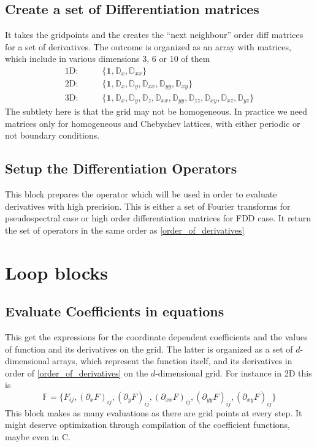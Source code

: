 \documentclass[a4paper,12pt]{article}
\newcommand{\p}{\partial}
\begin{document}
\subsection{\label{sec:diff_mat}Create a set of Differentiation matrices}
It takes the gridpoints and the creates the ``next neighbour'' order diff matrices for a set of derivatives. The outcome is organized as an array with matrices, which include in various dimensions 3, 6 or 10 of them
\begin{align}
\label{order_of_derivatives}
\mbox{1D}: & \qquad \{ \mathbf{1}, \mathbb{D}_{x}, \mathbb{D}_{x x} \} \\
\mbox{2D}: & \qquad \{ \mathbf{1}, \mathbb{D}_{x}, \mathbb{D}_{y}, \mathbb{D}_{xx}, \mathbb{D}_{yy}, \mathbb{D}_{xy} \} \\
\mbox{3D}: & \qquad \{ \mathbf{1}, \mathbb{D}_{x}, \mathbb{D}_{y},\mathbb{D}_{z}, \mathbb{D}_{xx}, \mathbb{D}_{yy}, \mathbb{D}_{zz}, \mathbb{D}_{xy}, \mathbb{D}_{xz}, \mathbb{D}_{yz} \}
\end{align}
The subtlety here is that the grid may not be homogeneous. In practice we need matrices only for homogeneous and Chebyshev lattices, with either periodic or not boundary conditions.

\subsection{\label{sec:diff_oper} Setup the Differentiation Operators}
This block prepares the operator which will be used in order to evaluate derivatives with high precision. This is either a set of Fourier transforms for pseudospectral case or high order differentiation matrices for FDD case. It return the set of operators in the same order as \eqref{order_of_derivatives}

\section{Loop blocks}

\subsection{\label{sec:eval_coefs} Evaluate Coefficients in equations}
This get the expressions for the coordinate dependent coefficients and the values of function and its derivatives on the grid. The latter is organized as a set of $d$-dimensional arrays, which represent the function itself, and its derivatives in order of \eqref{order_of_derivatives} on the $d$-dimensional grid. For instance in 2D  this is
\begin{equation}
\label{fatF}
\mathbb{F} = \{F_{ij}, (\p_x F)_{ij}, (\p_y F)_{ij}, (\p_{xx} F)_{ij}, (\p_{yy} F)_{ij}, (\p_{xy} F)_{ij} \}
\end{equation}
This block makes as many evaluations as there are grid points at every step. It might deserve optimization through compilation of the coefficient functions, maybe even in C.
\end{document}
